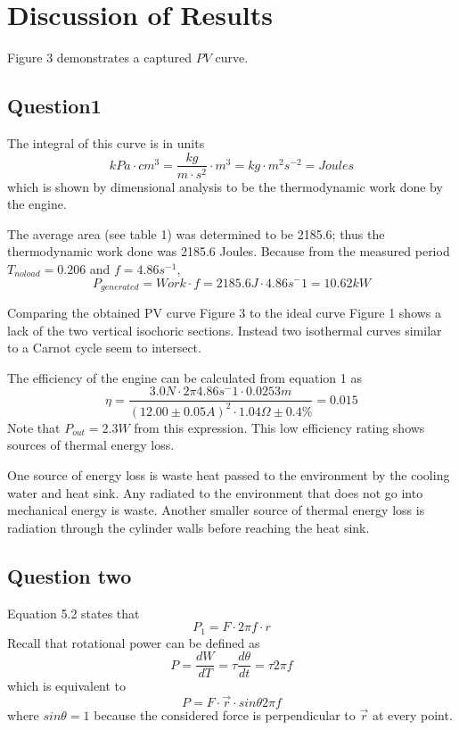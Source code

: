 \documentclass[9pt,twocolumn,twoside]{osajnl}
\begin{document}
\section{Discussion of Results}

Figure 3 %
demonstrates a captured $PV$ curve. 
\subsection{Question1}
The integral of this curve is in units \[kPa\cdot cm^3 = \frac{kg}{m\cdot s^2}\cdot m^3 = kg\cdot m^2 s^{-2} = Joules\] which is shown by dimensional analysis to be the thermodynamic work done by the engine. 

The average area (see table 1) was determined to be 2185.6; thus the thermodynamic work done was 2185.6 Joules. Because from the measured period $T_{noload} =0.206$ and $f =4.86s^{-1}$, %
\[P_{generated} = Work\cdot f = 2185.6J\cdot 4.86s^-1 = 10.62kW\]

Comparing the obtained PV curve Figure 3 to the ideal curve Figure 1 shows a lack of the two vertical isochoric sections. Instead two isothermal curves similar to a Carnot cycle seem to intersect. 

The efficiency of the engine can be calculated from equation 1 as \[\eta = \frac{3.0N\cdot 2\pi 4.86s^-1\cdot 0.0253m}{(12.00\pm0.05A)^2\cdot 1.04\Omega\pm0.4\%} = 0.015\]
Note that $P_{out} = 2.3W$ from this expression.
This low efficiency rating shows sources of thermal energy loss. 

One source of energy loss is waste heat passed to the environment by the cooling water and heat sink. Any radiated to the environment that does not go into mechanical energy is waste. Another smaller source of thermal energy loss is radiation through the cylinder walls before reaching the heat sink.

\subsection{Question two}

Equation 5.2 states that
\begin{equation}
P_1 = F\cdot2\pi f\cdot r
\end{equation}
Recall that rotational power can be defined as
\begin{equation}
P = \frac{dW}{dT} = \tau \frac{d\theta}{dt} = \tau2\pi f
\end{equation}
which is equivalent to
\begin{equation}
P = F\cdot \vec{r} \cdot sin\theta  2\pi f
\end{equation}
where \(sin\theta = 1\) because the considered force is perpendicular to $\vec{r}$ at every point.\cite{rotationalpower}
\end{document}
